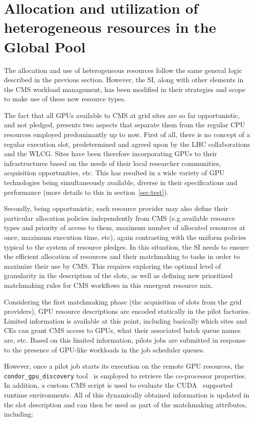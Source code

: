 \documentclass[a4paper]{jpconf}
\begin{document}
\section{Allocation and utilization of heterogeneous resources in the Global Pool}\label{sec:gpu_allocation}
The allocation and use of heterogeneous resources follow the same general logic described in the previous section. However, the SI, along with other elements in the CMS workload management, has been modified in their strategies and scope to make use of these new resource types.

The fact that all GPUs available to CMS at grid sites are so far opportunistic, and not pledged, presents two aspects that separate them from the regular CPU resources employed predominantly up to now. First of all, there is no concept of a regular execution slot, predetermined and agreed upon by the LHC collaborations and the WLCG. Sites have been therefore incorporating GPUs to their infrastructures based on the needs of their local researcher communities, acquisition opportunities, etc. This has resulted in a wide variety of GPU technologies being simultaneously available, diverse in their specifications and performance (more details to this in section~\ref{sec:test}). 

Secondly, being opportunistic, each resource provider may also define their particular allocation policies independently from CMS (e.g available resource types and priority of access to them, maximum number of allocated resources at once, maximum execution time, etc), again contrasting with the uniform policies typical to the system of resource pledges. In this situation, the SI needs to ensure the efficient allocation of resources and their matchmaking to tasks in order to maximize their use by CMS. This requires exploring the optimal level of granularity in the description of the slots, as well as defining new prioritized matchmaking rules for CMS workflows in this emergent resource mix. 

Considering the first matchmaking phase (the acquisition of slots from the grid providers), GPU resource descriptions are encoded statically in the pilot factories. Limited information is available at this point, including basically which sites and CEs can grant CMS access to GPUs, what their associated batch queue names are, etc. Based on this limited information, pilots jobs are submitted in response to the presence of GPU-like workloads in the job scheduler queues. 

However, once a pilot job starts its execution on the remote GPU resources, the \verb|condor_gpu_discovery| tool~\cite{condorgpudiscovery} is employed to retrieve the co-processor properties. In addition, a custom CMS script is used to evaluate the CUDA~\cite{cuda} supported runtime environments. All of this dynamically obtained information is updated in the slot description and can then be used as part of the matchmaking attributes, including:
\end{document}
